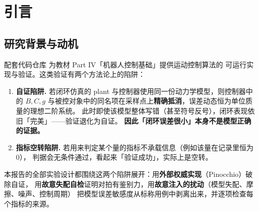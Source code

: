 \documentclass[11pt,a4paper]{ctexart}
\begin{document}
\begin{abstract}
\medskip\noindent\textbf{发现的问题.}
验证过程本身抓出并修复了 1 个真 bug（RK4 的 $q$ 更新只有一阶精度，全局经验收敛阶
$1.000\to3.9926$）与 1 处测试自证（副本对拍拿到的「原件」其实是副本），据此新增了「积分器收敛阶」
判据作为常设守卫；执行期共修订 20 处口径/实现问题（阈值一字未动），逐条列于第~\ref{sec:revisions}~节。
同时如实报告了 12 条负结果或未达标项（如摩擦未补偿的 log-log 斜率只测到 $0.05$--$0.21$）、
8 项未做测试及其原因，以及 8 条局限声明。

\medskip\noindent\textbf{结论.}
4 个算法的\textbf{控制律实现与书中公式一致}，并被独立的数值证据支持；
两个 OS 算法的判定为「\textbf{在书中所声明前提内已验证}」。
\end{abstract}

\clearpage
\tableofcontents
\clearpage

\section{引言}

\subsection{研究背景与动机}

配套代码仓库  为教材 Part IV「机器人控制基础」提供运动控制算法的
可运行实现与验证。这类验证有两个方法论上的陷阱：

\begin{enumerate}[leftmargin=2em,itemsep=2pt]
\item \textbf{自证陷阱.} 若闭环仿真的 plant 与控制器使用同一份动力学模型，则控制器中的 $B,C,g$
  与被控对象中的同名项在采样点上\textbf{精确抵消}，误差动态恒为单位质量的理想二阶系统。
  此时即使该模型整体写错（甚至符号反号），闭环表现依旧「完美」——验证退化为自证。
  \textbf{因此「闭环误差很小」本身不是模型正确的证据。}
\item \textbf{指标空转陷阱.} 若用来判定某个量的指标不承载信息（例如该量在记录里恒为 0），
  判据会无条件通过，看起来「验证成功」，实际上是空转。
\end{enumerate}

本报告的全部实验设计都围绕这两个陷阱展开：用\textbf{外部权威实现}（Pinocchio）破除自证，
用\textbf{故意失配自检}证明对拍有鉴别力，用\textbf{故意注入的扰动}（模型失配、摩擦、噪声、控制周期）
把模型误差敏感度从标称用例中剥离出来，并逐项检查每个指标的来源。
\end{document}
